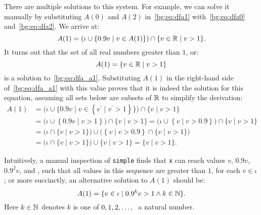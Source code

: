 There are multiple solutions to this system.  For example, we can solve
it manually by substituting $A(0)$ and $A(2)$ in~\eqref{bg:eq:dfa1}
with~\eqref{bg:eq:dfa0} and~\eqref{bg:eq:dfa2}.  We arrive at:
\begin{equation}
    A(1) = \left(
        \iota \cup \left\{ 0.9 v \mid v \in A(1) \right\}
    \right) \cap \{ v \in \mathbb{R} \mid v > 1 \}.
    \label{bg:eq:dfa_a1}
\end{equation}
It turns out that the set of all real numbers greater than $1$, or:
\begin{equation}
    A(1) = \{ v \in \mathbb{R} \mid v > 1 \}
    \label{bg:eq:a11}
\end{equation}
is a solution to~\eqref{bg:eq:dfa_a1}.  Substituting $A(1)$ in the right-hand
side of~\eqref{bg:eq:dfa_a1} with this value proves that it is indeed the
solution for this equation, assuming all sets below are subsets of $\mathbb{R}$
to simplify the derivation:
\begin{equation}
    \begin{aligned}
        A(1)
        &= \bigg( \iota \cup \Big\{ 0.9 v \mid v \in
                \left\{ v^\prime \mid v^\prime > 1 \right\}
           \Big\} \bigg) \cap \{ v \mid v > 1 \} \\
        &= \bigg( \iota \cup \left\{ 0.9 v \mid v > 1 \right\} \bigg) \cap
           \{ v \mid v > 1 \}
         = \bigg( \iota \cup \left\{ v \mid v > 0.9 \right\} \bigg) \cap
           \{ v \mid v > 1 \} \\
        &= \bigg( \iota \cap \{ v \mid v > 1 \} \bigg) \cup
           \bigg(
               \left\{ v \mid v > 0.9 \right\} \cap \{ v  \mid v > 1 \}
           \bigg) \\
        &= \bigg( \iota \cap \{ v \mid v > 1 \} \bigg) \cup
           \{ v \mid v > 1 \}
         = \{ v \mid v > 1 \}.
    \end{aligned}
\end{equation}

Intuitively, a manual inspection of \verb|simple| finds that \verb|x| can reach
values $v$, $0.9 v$, $0.9^2 v$, and \textellipsis, such that all values in this
sequence are greater than $1$, for each $v \in \iota$; or more succinctly, an
alternative solution to $A(1)$ should be:
\begin{equation}
    A(1) = \{ v \in \iota \mid 0.9^k v > 1 \wedge k \in \mathbb{N} \}.
    \label{bg:eq:a12}
\end{equation}
Here $k \in \mathbb{N}$ denotes $k$ is one of $0, 1, 2, \mathellipsis$, \ie~a
natural number.

